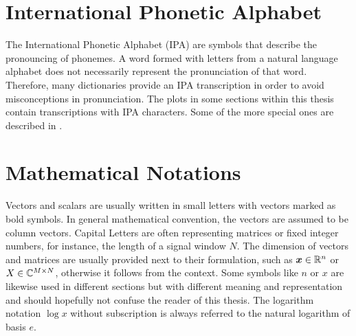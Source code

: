
\section{International Phonetic Alphabet}\label{sec:appendix_ipa}
The International Phonetic Alphabet (IPA) are symbols that describe the pronouncing of phonemes.
A word formed with letters from a natural language alphabet does not necessarily represent the pronunciation of that word.
Therefore, many dictionaries provide an IPA transcription in order to avoid misconceptions in pronunciation.
The plots in some sections within this thesis contain transcriptions with IPA characters.
Some of the more special ones are described in .




\section{Mathematical Notations}\label{sec:appendix_math}
Vectors and scalars are usually written in small letters with vectors marked as bold symbols.
In general mathematical convention, the vectors are assumed to be column vectors.
Capital Letters are often representing matrices or fixed integer numbers, for instance, the length of a signal window $N$.
The dimension of vectors and matrices are usually provided next to their formulation, such as $\bm{x} \in \mathbb{R}^n$ or $X \in \mathbb{C}^{M \times N}$, otherwise it follows from the context.
Some symbols like $n$ or $x$ are likewise used in different sections but with different meaning and representation and should hopefully not confuse the reader of this thesis.
The logarithm notation $\log x$ without subscription is always referred to the natural logarithm of basis $e$.